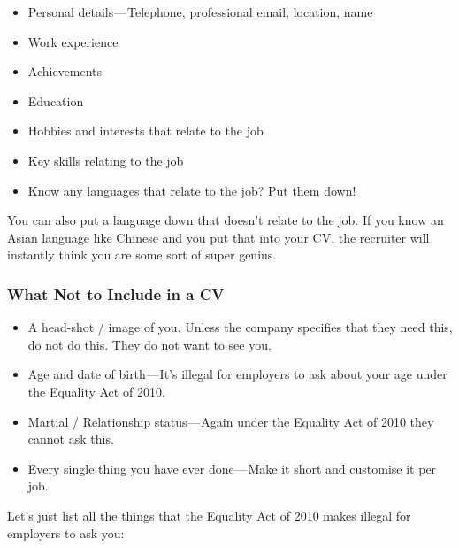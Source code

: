 \documentclass{article}
\begin{document}
\begin{itemize}
\item
  Personal details --- Telephone, professional email, location, name
\item
  Work experience
\item
  Achievements
\item
  Education
\item
  Hobbies and interests that relate to the job
\item
  Key skills relating to the job
\item
  Know any languages that relate to the job? Put them down!
\end{itemize}
You can also put a language down that doesn't relate to the job. If you
know an Asian language like Chinese and you put that into your CV, the
recruiter will instantly think you are some sort of super genius.

\subsubsection{What Not to Include in a CV}
\begin{itemize}
\item
  A head-shot / image of you. Unless the company specifies that they
  need this, do not do this. They do not want to see you.
\item
  Age and date of birth --- It's illegal for employers to ask about your
  age under the Equality Act of 2010.
\item
  Martial / Relationship status --- Again under the Equality Act of 2010
  they cannot ask this.
\item
  Every single thing you have ever done --- Make it short and customise
  it per job.
\end{itemize}
Let's just list all the things that the Equality Act of 2010 makes
illegal for employers to ask you:
\end{document}
